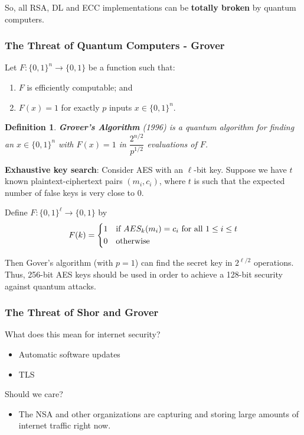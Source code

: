 \documentclass[12pt,titlepage]{article}
\newtheorem{protodefinition}[prototheorem]{Definition}
\newenvironment{definition}
{\colorlet{shadecolor}{cyan!15}\begin{shaded}\begin{protodefinition}\normalfont}{\end{protodefinition}\end{shaded}}
\begin{document}
So, all RSA, DL and ECC implementations can be \textbf{totally broken} by quantum computers.
\subsubsection{The Threat of Quantum Computers - Grover}
Let $F: \{0, 1\}^n \rightarrow \{0, 1\}$ be a function such that:\begin{enumerate}
	\item $F$ is efficiently computable; and
	\item $F(x) = 1$ for exactly $p$ inputs $x \in \{0, 1\}^n$.
\end{enumerate}
\begin{definition}
	\textbf{Grover’s Algorithm} (1996) is a quantum algorithm for finding an $x \in \{0, 1\}^n$ with $F(x) = 1$ in $\dfrac{2^{n/2}}{p^{1/2}}$ evaluations of $F$.
\end{definition}

\textbf{Exhaustive key search}: Consider AES with an $\ell$-bit key. Suppose we have $t$ known plaintext-ciphertext pairs $(m_i, c_i)$, where $t$ is such that the expected number of false keys is very close to 0.

Define $F : \{0, 1\}^\ell \rightarrow \{0, 1\}$ by $$F(k) = \begin{dcases}
	1 & \text{if }AES_k(m_i) = c_i \text{ for all } 1 \leq i \leq t\\
	0 & \text{otherwise}
\end{dcases}$$

Then Gover’s algorithm (with $p = 1$) can find the secret key in $2^{\ell/2}$ operations. Thus, 256-bit AES keys should be used in order to achieve a 128-bit security against quantum attacks.

\subsubsection{The Threat of Shor and Grover}
What does this mean for internet security?\begin{itemize}
	\item Automatic software updates
	\item TLS
\end{itemize}
Should we care?\begin{itemize}
	\item The NSA and other organizations are capturing and storing large amounts of internet traffic right now.
\end{itemize}
\end{document}
